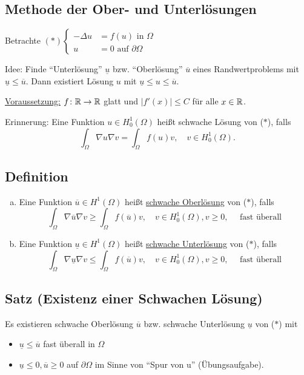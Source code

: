 \subsection{Methode der Ober- und Unterlösungen}

Betrachte $(\ast) \begin{cases} -\Delta u &= f(u) \text{ in } \Omega \\ u &= 0 \text{ auf } \partial \Omega \end{cases}$

Idee: Finde ``Unterlösung'' $\underline{u}$ bzw. ``Oberlösung'' $\overline{u}$ eines Randwertproblems mit $\underline u \leq \overline u$. 
Dann existiert Lösung $u$ mit $\underline u \leq u \leq \overline u$.

\underline{Voraussetzung:} $f \colon \mathbb{R} \to \mathbb{R}$ glatt und $|f'(x)| \leq C$ für alle $x \in \mathbb{R}$.

Erinnerung: Eine Funktion $u \in H_0^1(\Omega)$ heißt schwache Lösung von ($\ast$), falls
$$ \int_\Omega \nabla u \nabla v = \int_\Omega f(u) v, \quad v \in H_0^1(\Omega).$$

\subsection{Definition}

\begin{enumerate}[a)]
  \item Eine Funktion $\overline{u} \in H^1(\Omega)$ heißt \underline{schwache Oberlösung} von ($\ast$), falls
    $$
    \int_\Omega \nabla \overline u \nabla v \geq \int_\Omega f(\overline u) v, \quad v \in H_0^1(\Omega), v \geq 0, \quad \text{ fast überall}
    $$

  \item Eine Funktion $\underline u \in H^1(\Omega)$ heißt \underline{schwache Unterlösung} von ($\ast$), falls
    $$
    \int_\Omega \nabla \underline u \nabla v \leq \int_\Omega f(\overline u) v, \quad v \in H_0^1(\Omega), v \geq 0, \quad \text{ fast überall}
    $$
\end{enumerate}

\subsection{Satz (Existenz einer Schwachen Lösung)}

Es existieren schwache Oberlösung $\overline u$ bzw. schwache Unterlösung $\underline u$ von ($\ast$) mit
\begin{itemize}
  \item $\underline u \leq \overline u$ fast überall in $\Omega$
  \item $\underline u \leq 0, \overline u \geq 0$ auf $\partial \Omega$ im Sinne von ``Spur von u'' (Übungsaufgabe).
\end{itemize}


